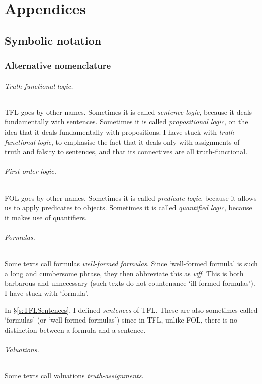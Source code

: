 \part*{Appendices}

\chapter{Symbolic notation}\label{app.notation}

\section{Alternative nomenclature}
\paragraph{Truth-functional logic.} TFL goes by other names. Sometimes it is called \emph{sentence logic}, because it deals fundamentally with sentences. Sometimes it is called \emph{propositional logic}, on the idea that it deals fundamentally with propositions. I have stuck with \emph{truth-functional logic}, to emphasise the fact that it deals only with assignments of truth and falsity to sentences, and that its connectives are all truth-functional.

\paragraph{First-order logic.} FOL goes by other names. Sometimes it is called \emph{predicate logic}, because it allows us to apply  predicates to objects. Sometimes it is called \emph{quantified logic}, because it makes use of quantifiers.

\paragraph{Formulas.} Some texts call formulas \emph{well-formed formulas}. Since `well-formed formula' is such a long and cumbersome phrase, they then abbreviate this as \emph{wff}. This is both barbarous and unnecessary (such texts do not countenance `ill-formed formulas'). I have stuck with `formula'. 

In \S\ref{s:TFLSentences}, I defined \emph{sentences} of TFL. These are also sometimes called `formulas' (or `well-formed formulas') since in TFL, unlike FOL, there is no distinction between a formula and a sentence.

\paragraph{Valuations.} Some texts call valuations \emph{truth-assignments}. 


